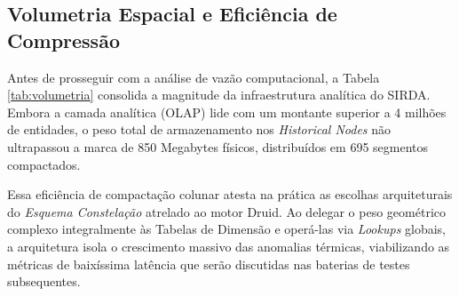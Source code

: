 \subsection{Volumetria Espacial e Eficiência de Compressão}

Antes de prosseguir com a análise de vazão computacional, a Tabela \ref{tab:volumetria} consolida a magnitude da infraestrutura analítica do SIRDA. Embora a camada analítica (OLAP) lide com um montante superior a 4 milhões de entidades, o peso total de armazenamento nos \textit{Historical Nodes} não ultrapassou a marca de 850 Megabytes físicos, distribuídos em 695 segmentos compactados.

\begin{table}[H]
    \centering
    \caption{Volumetria de Entidades no Apache Druid.}
    \label{tab:volumetria}
\end{table}

Essa eficiência de compactação colunar atesta na prática as escolhas arquiteturais do \textit{Esquema Constelação} atrelado ao motor Druid. Ao delegar o peso geométrico complexo integralmente às Tabelas de Dimensão e operá-las via \textit{Lookups} globais, a arquitetura isola o crescimento massivo das anomalias térmicas, viabilizando as métricas de baixíssima latência que serão discutidas nas baterias de testes subsequentes.
